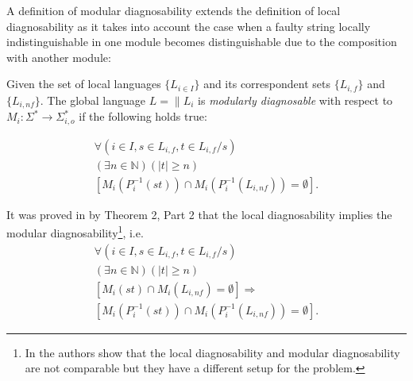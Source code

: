 \documentclass[a4paper, 10pt, conference]{ieeeconf}
\begin{document}
A definition of modular diagnosability extends the definition of local
diagnosability as it takes into account the case when a faulty string locally
indistinguishable in one module becomes distinguishable due to the
composition with another module:

\begin{definition} Given the set of local languages
$\{L_{i \in I}\}$ and its correspondent sets $\{L_{i,f}\}$ and
$\{L_{i,nf}\}$. The global language $L = \parallel L_i$ is \emph{modularly
diagnosable} with respect to
$M_i: \Sigma^* \rightarrow \Sigma_{i,o}^*$ 
if the following holds true:
\end{definition}
\begin{equation}
\begin{array}{l}
	\forall(i \in I, s \in L_{i,f}, t \in L_{i,f}/s)
	\\
	(\exists n \in \mathbb{N})
	(|t| \geq n)
	\\
	\left[ M_i(P_i^{-1}(st)) \cap M_i(P_i^{-1}(L_{i,nf})) = \emptyset \right].
\end{array}
\end{equation}

It was proved in \cite{contant_diagnosability_2006} by Theorem 2, Part 2 
that the local diagnosability implies the modular diagnosability\footnote{In
\cite{zhou_decentralized_2008} the authors show that the local diagnosability
and modular diagnosability are not comparable but they have a different setup
for the problem.}, i.e.
\begin{equation}
\begin{array}{l}
	\forall(i \in I, s \in L_{i,f}, t \in L_{i,f}/s)
	\\
	(\exists n \in \mathbb{N})
	(|t| \geq n)
	\\
	\left[ M_i(st) \cap M_i(L_{i,nf}) = \emptyset \right]
	\Rightarrow 
	\\ 
	\left[ M_i(P_i^{-1}(st)) \cap M_i(P_i^{-1}(L_{i,nf})) = \emptyset \right].
\end{array}
\end{equation}
\end{document}
